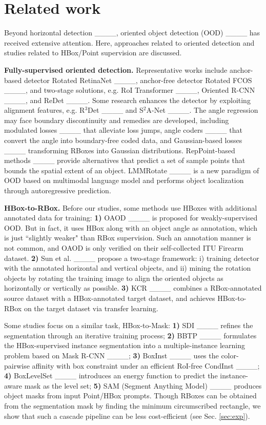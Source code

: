 \section{Related work}
\label{sec:work}

Beyond horizontal detection ____, oriented object detection (OOD) ____ has received extensive attention. Here, approaches related to oriented detection and studies related to HBox/Point supervision are discussed.

\textbf{Fully-supervised oriented detection.} Representative works include anchor-based detector Rotated RetinaNet ____, anchor-free detector Rotated FCOS ____, and two-stage solutions, e.g. RoI Transformer ____, Oriented R-CNN ____, and ReDet ____. Some research enhances the detector by exploiting alignment features, e.g. R$^3$Det ____ and S$^2$A-Net ____. The angle regression may face boundary discontinuity and remedies are developed, including modulated losses ____ that alleviate loss jumps, angle coders ____ that convert the angle into boundary-free coded data, and Gaussian-based losses ____ transforming RBoxes into Gaussian distributions. RepPoint-based methods ____ provide alternatives that predict a set of sample points that bounds the spatial extent of an object. LMMRotate ____ is a new paradigm of OOD based on multimodal language model and performs object localization through autoregressive prediction.

\textbf{HBox-to-RBox.} 
Before our studies, some methods use HBoxes with additional annotated data for training: \textbf{1)} OAOD ____ is proposed for weakly-supervised OOD. But in fact, it uses HBox along with an object angle as annotation, which is just ``slightly weaker" than RBox supervision. Such an annotation manner is not common, and OAOD is only verified on their self-collected ITU Firearm dataset. 
\textbf{2)} Sun et al. ____ propose a two-stage framework: i) training detector with the annotated horizontal and vertical objects, and ii) mining the rotation objects by rotating the training image to align the oriented objects as horizontally or vertically as possible.
\textbf{3)} KCR ____ combines a RBox-annotated source dataset with a HBox-annotated target dataset, and achieves HBox-to-RBox on the target dataset via transfer learning.

Some studies focus on a similar task, HBox-to-Mask: \textbf{1)} SDI ____ refines the segmentation through an iterative training process; \textbf{2)} BBTP ____ formulates the HBox-supervised instance segmentation into a multiple-instance learning problem based on Mask R-CNN ____; \textbf{3)} BoxInst ____ uses the color-pairwise affinity with box constraint under an efficient RoI-free CondInst ____; \textbf{4)} BoxLevelSet ____ introduces an energy function to predict the instance-aware mask as the level set; \textbf{5)} SAM (Segment Anything Model) ____ produces object masks from input Point/HBox prompts. Though RBoxes can be obtained from the segmentation mask by finding the minimum circumscribed rectangle, we show that such a cascade pipeline can be less cost-efficient (see Sec. \ref{sec:exp}). 

